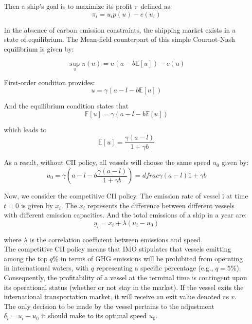 \documentclass[a4paper,12pt]{article}
\begin{document}
Then a ship's goal is to maximize its profit $\pi$ defined as:
\begin{equation}
	\label{eq:profit}
	\pi_i=u_ip(u)-c(u_i)
\end{equation}

In the absence of carbon emission constraints, the shipping market exists in a state of equilibrium. The Mean-field counterpart of this simple Cournot-Nash equilibrium is given by:

\begin{equation}
	\label{eq:Cournot-Nash}
	\operatorname*{sup}_{u} \pi(u) = u(a-b\mathbb{E}[u])-c(u)
\end{equation}

First-order condition provides:
\begin{equation}
	\label{eq:equilibrium1}
	u = \gamma(a-l-b\mathbb{E}[u])
\end{equation}

And the equilibrium condition states that
\begin{equation}
	\label{eq:condition1}
	\mathbb{E}[u]= \gamma (a-l-b\mathbb{E}[u])
\end{equation}

which leads to
\begin{equation}
	\mathbb{E}[u] = \dfrac{\gamma (a-l)}{1+\gamma b}
\end{equation}

As a result, without CII policy, all vessels will choose the same speed $u_0$ given by:
\begin{equation}
	\label{eq:u0}
	u_0 = \gamma \left(a-l-b \dfrac{\gamma (a-l)}{1+\gamma b}\right)=dfrac{\gamma (a-l)}{1+\gamma b}
\end{equation}

Now, we consider the competitive CII policy. The emission rate of vessel i at time $t=0$ is given by $x_i$.
The $x_i$ represents the difference between different vessels with different emission capacities. And the total emissions of a ship in a year are:
\begin{equation}
	\label{eq:y}
	y_i = x_i + \lambda(u_i-u_0)
\end{equation}

where $\lambda$ is the correlation coefficient between emissions and speed.\\

The competitive CII policy means that IMO stipulates that vessels emitting among the top $q\%$ in terms of GHG emissions will be prohibited from operating in international waters, with $q$ representing a specific percentage (e.g., $q = 5\%$).
Consequently, the profitability of a vessel at the terminal time is contingent upon its operational status (whether or not stay in the market).
If the vessel exits the international transportation market, it will receive an exit value denoted as $v$.
The only decision to be made by the vessel pertains to the adjustment $\delta_i=u_i-u_0$ it should make to its optimal speed $u_0$.\\
\end{document}
